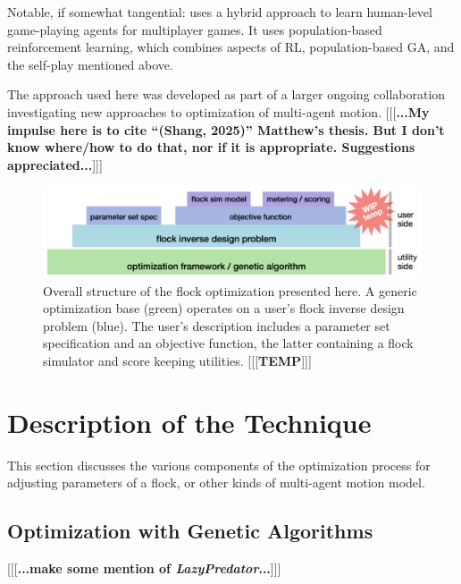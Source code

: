 \documentclass[letterpaper]{article}
\begin{document}
Notable, if somewhat tangential: \citet{jaderberg_human-level_2019} uses a hybrid approach to learn human-level game-playing agents for multiplayer games. It uses population-based reinforcement learning, which combines aspects of RL, population-based GA, and the self-play mentioned above.

The approach used here was developed as part of a larger ongoing collaboration investigating new approaches to optimization of multi-agent motion. [[[\textbf{...My impulse here is to cite ``(Shang, 2025)'' Matthew's thesis. But I don't know where/how to do that, nor if it is appropriate. Suggestions appreciated...}]]]


\begin{figure}[t]
    \centering
    \includegraphics[width=0.9\linewidth]{images/temp_system_blocks.png}
    \caption{Overall structure of the flock optimization presented here. A generic optimization base (green) operates on a user's flock inverse design problem (blue). The user's description includes a parameter set specification and an objective function, the latter containing a flock simulator and score keeping utilities. [[[\textbf{TEMP}]]]}
    \label{fig:system_blocks}
\end{figure}


\section{Description of the Technique}
\label{sec:Description}

This section discusses the various components of the optimization process for adjusting parameters of a flock, or other kinds of multi-agent motion model.


\subsection{Optimization with Genetic Algorithms}
\label{subsec:Optimization_with_GA}

[[[\textbf{...make some mention of \textit{LazyPredator}...}]]]
\end{document}
